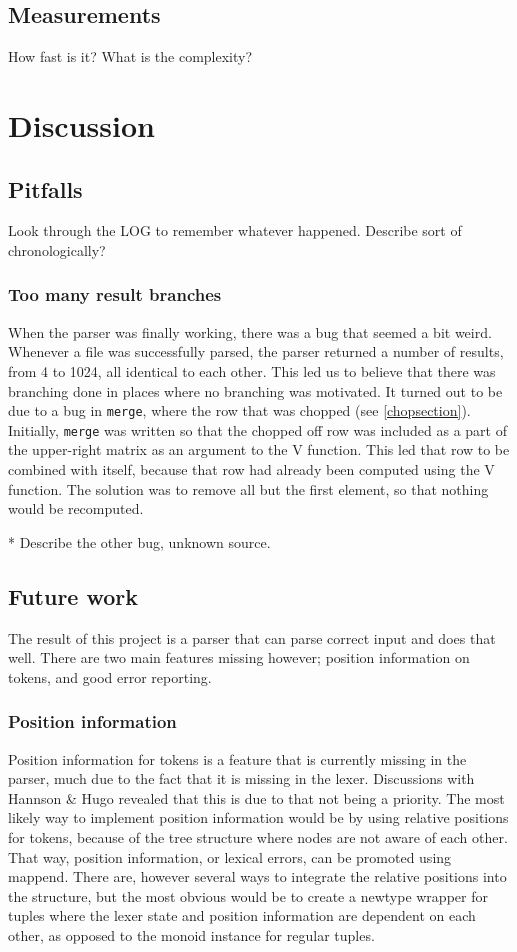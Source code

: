 \documentclass[a4paper,12pt,twosided]{report}
\begin{document}
\section{Measurements}
How fast is it? What is the complexity?

%
%
\chapter{Discussion}

\section{Pitfalls}
Look through the LOG to remember whatever happened. Describe sort of chronologically?

\subsection{Too many result branches}
When the parser was finally working, there was a bug that seemed a bit weird.
Whenever a file was successfully parsed, the parser returned a number of
results, from 4 to 1024, all identical to each other. This led us to believe
that there was branching done in places where no branching was motivated. It
turned out to be due to a bug in \texttt{merge}, where the row that was chopped
(see \ref{chopsection}). Initially, \texttt{merge} was written so that the
chopped off row was included as a part of the upper-right matrix as an argument
to the V function. This led that row to be combined with itself, because that
row had already been computed using the V function. The solution was to remove
all but the first element, so that nothing would be recomputed. 

* Describe the other bug, unknown source.

\section{Future work}
The result of this project is a parser that can parse correct input and does
that well. There are two main features missing however; position information on
tokens, and good error reporting.

\subsection{Position information}
Position information for tokens is a feature that is currently missing in the
parser, much due to the fact that it is missing in the lexer. Discussions with
Hannson \& Hugo revealed that this is due to that not being a priority. The
most likely way to implement position information would be by using relative
positions for tokens, because of the tree structure where nodes are not aware of
each other. That way, position information, or lexical errors, can be promoted
using mappend. There are, however several ways to integrate the relative
positions into the structure, but the most obvious would be to create a newtype
wrapper for tuples where the lexer state and position information are dependent
on each other, as opposed to the monoid instance for regular tuples. 
\end{document}
